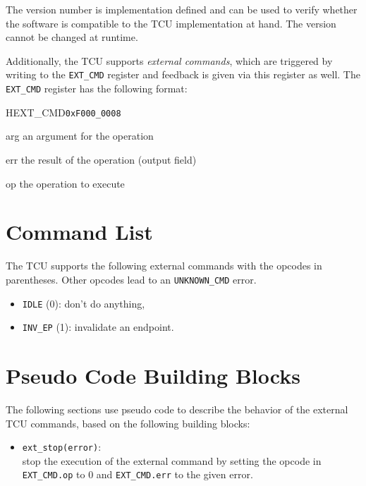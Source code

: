 The version number is implementation defined and can be used to verify whether the software is
compatible to the TCU implementation at hand. The version cannot be changed at runtime.

Additionally, the TCU supports \emph{external commands}, which are triggered by writing to the
\texttt{EXT\_CMD} register and feedback is given via this register as well. The \texttt{EXT\_CMD}
register has the following format:

\begin{register}{H}{EXT\_CMD}{\texttt{0xF000\_0008}}
  \regnewline%
  \begin{regdesc}\begin{reglist}
    \item[arg] an argument for the operation
    \item[err] the result of the operation (output field)
    \item[op] the operation to execute
  \end{reglist}\end{regdesc}
\end{register}

\section{Command List}

The TCU supports the following external commands with the opcodes in parentheses. Other opcodes lead
to an \texttt{UNKNOWN\_CMD} error.

\begin{itemize}
  \item \texttt{IDLE} (0): don't do anything,
  \item \texttt{INV\_EP} (1): invalidate an endpoint.
\end{itemize}

\section{Pseudo Code Building Blocks}
\label{sec:extcmdspseudo}

The following sections use pseudo code to describe the behavior of the external TCU commands, based
on the following building blocks:

\begin{itemize}
  \item \texttt{ext\_stop(error)}:\\
  stop the execution of the external command by setting the opcode in \texttt{EXT\_CMD.op} to 0 and
  \texttt{EXT\_CMD.err} to the given error.
\end{itemize}

